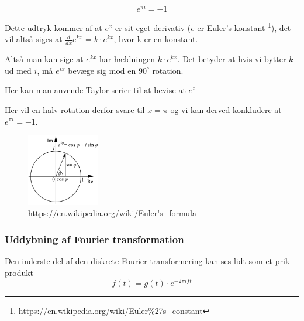 \documentclass[11pt,a4paper]{article}
\begin{document}
$$
e^{\pi i} = -1
$$

Dette udtryk kommer af at \(e^x\) er sit eget derivativ (\(e\) er Euler's konstant \footnote{\url{https://en.wikipedia.org/wiki/Euler\%27s\_constant}}),
det vil altså siges at \(\frac{d}{dx}e^{kx} = k\cdot e^{kx}\), hvor k er en konstant.

Altså man kan sige at \(e^{kx}\) har hældningen \(k \cdot e^{kx}\).
Det betyder at hvis vi bytter \(k\) ud med \(i\), må \(e^{ix}\) bevæge sig mod en \(90^\circ\) rotation.

Her kan man anvende Taylor serier til at bevise at \(e^z\)

Her vil en halv rotation derfor svare til \(x=\pi\) og vi kan derved konkludere at \(e^{\pi i} = -1\).

\begin{figure}[htbp]
\centering
\includegraphics[width=120]{./eulers_formula.png}
\caption{\url{https://en.wikipedia.org/wiki/Euler's\_formula}}
\end{figure}

\subsubsection{Uddybning af Fourier transformation}
\label{sec:org6345f20}

Den inderste del af den diskrete Fourier transformering kan ses lidt som et prik produkt
$$
f(t) = g(t) \cdot e ^{-2\pi ift}
$$
\end{document}
